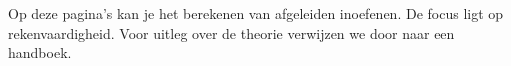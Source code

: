 \documentclass{ximera}
\begin{document}
	\author{Wiskundeplan}


Op deze pagina's kan je het berekenen van afgeleiden inoefenen. 
De focus ligt op rekenvaardigheid. Voor uitleg over de theorie verwijzen we door naar een handboek. 
\end{document}
